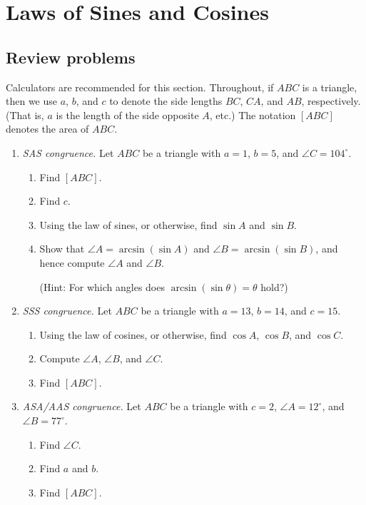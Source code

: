 \section{Laws of Sines and Cosines}

\subsection{Review problems}

Calculators are recommended for this section. Throughout, if $ABC$ is a triangle, then we use $a$, $b$, and $c$ to denote the side lengths $BC$, $CA$, and $AB$, respectively. (That is, $a$ is the length of the side opposite $A$, etc.) The notation $[ABC]$ denotes the area of $ABC$.

\begin{enumerate}
\item \emph{SAS congruence.} Let $ABC$ be a triangle with $a = 1$, $b = 5$, and $\angle C = 104^{\circ}$.
\begin{enumerate}
\item Find $[ABC]$.
\item Find $c$.
\item Using the law of sines, or otherwise, find $\sin A$ and $\sin B$.
\item Show that $\angle A = \arcsin(\sin A)$ and $\angle B = \arcsin(\sin B)$, and hence compute $\angle A$ and $\angle B$.\par
(Hint: For which angles does $\arcsin(\sin\theta) = \theta$ hold?)
\end{enumerate}
\item \emph{SSS congruence.} Let $ABC$ be a triangle with $a = 13$, $b = 14$, and $c = 15$.
\begin{enumerate}
\item Using the law of cosines, or otherwise, find $\cos A$, $\cos B$, and $\cos C$.
\item Compute $\angle A$, $\angle B$, and $\angle C$.
\item Find $[ABC]$.
\end{enumerate}
\item \emph{ASA/AAS congruence.} Let $ABC$ be a triangle with $c = 2$, $\angle A = 12^{\circ}$, and $\angle B = 77^{\circ}$.
\begin{enumerate}
\item Find $\angle C$.
\item Find $a$ and $b$.
\item Find $[ABC]$.
\end{enumerate}

\end{enumerate}
